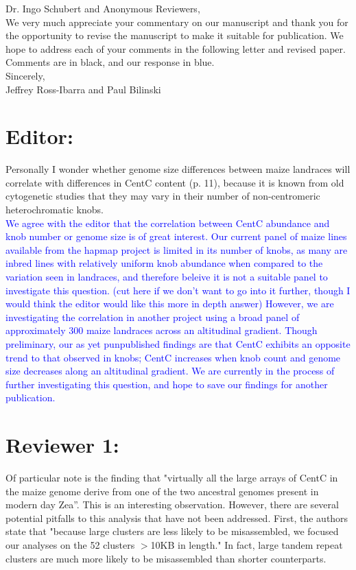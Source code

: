 \documentclass[]{article}
\newcommand{\res}[1]{\noindent \textcolor{blue}{{#1}} \\}
\begin{document}
\noindent Dr. Ingo Schubert and Anonymous Reviewers, \\

We very much appreciate your commentary on our manuscript and thank you for the opportunity to revise the manuscript to make it suitable for publication.  
We hope to address each of your comments in the following letter and revised paper. Comments are in black, and our response in blue.\\

\noindent Sincerely,\\

\noindent Jeffrey Ross-Ibarra and Paul Bilinski

\section*{Editor:}

Personally I wonder whether genome size differences between maize landraces will correlate with differences in CentC content (p. 11), because it is known from old cytogenetic studies that they may vary in their number of non-centromeric heterochromatic knobs. \\

\res{We agree with the editor that the correlation between CentC abundance and knob number or genome size is of great interest. 
 Our current panel of maize lines available from the hapmap project is limited in its number of knobs, as many are inbred lines with relatively uniform knob abundance when compared to the variation seen in landraces, and therefore beleive it is not a suitable panel to investigate this question.
(cut here if we don't want to go into it further, though I would think the editor would like this more in depth answer)
However, we are investigating the correlation in another project using a broad panel of approximately 300 maize landraces across an altitudinal gradient.  
Though preliminary, our as yet punpublished findings are that CentC exhibits an opposite trend to that observed in knobs; CentC increases when knob count and genome size decreases along an altitudinal gradient.  
We are currently in the process of further investigating this question, and hope to save our findings for another publication.}

\section*{Reviewer 1:}

Of particular note is the finding that "virtually all the large arrays of CentC in the maize genome derive from one of the two ancestral genomes present in modern day Zea”.  This is an interesting observation.  However, there are several potential pitfalls to this analysis that have not been addressed.  First, the authors state that "because large clusters are less likely to be misassembled, we focused our analyses on the 52 clusters $>$10KB in length."  In fact, large tandem repeat clusters are much more likely to be misassembled than shorter counterparts. \\
\end{document}
